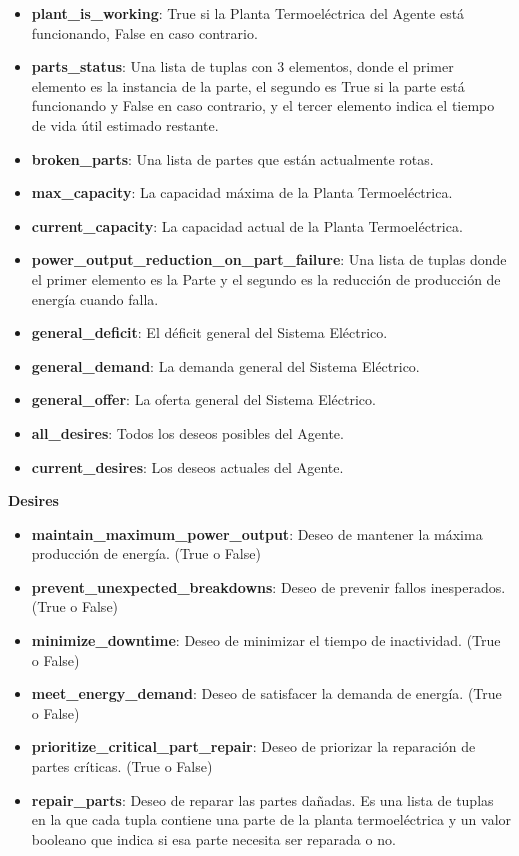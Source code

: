 \documentclass[twocolumn, fontsize=10pt]{article}
\begin{document}
\begin{itemize}
  \item \textbf{plant\_is\_working}: True si la Planta Termoeléctrica del Agente está funcionando, False en caso contrario.
  \item \textbf{parts\_status}: Una lista de tuplas con 3 elementos, donde el primer elemento es la instancia de la parte, el segundo es True si la parte está funcionando y False en caso contrario, y el tercer elemento indica el tiempo de vida útil estimado restante.
  \item \textbf{broken\_parts}: Una lista de partes que están actualmente rotas.
  \item \textbf{max\_capacity}: La capacidad máxima de la Planta Termoeléctrica.
  \item \textbf{current\_capacity}: La capacidad actual de la Planta Termoeléctrica.
  \item \textbf{power\_output\_reduction\_on\_part\_failure}: Una lista de tuplas donde el primer elemento es la Parte y el segundo es la reducción de producción de energía cuando falla.
  \item \textbf{general\_deficit}: El déficit general del Sistema Eléctrico.
  \item \textbf{general\_demand}: La demanda general del Sistema Eléctrico.
  \item \textbf{general\_offer}: La oferta general del Sistema Eléctrico.
  \item \textbf{all\_desires}: Todos los deseos posibles del Agente.
  \item \textbf{current\_desires}: Los deseos actuales del Agente.
\end{itemize}
\textbf{Desires}
\begin{itemize}
  
  \item \textbf{maintain\_maximum\_power\_output}: Deseo de mantener la máxima producción de energía. (True o False)
  \item \textbf{prevent\_unexpected\_breakdowns}: Deseo de prevenir fallos inesperados. (True o False)
  \item \textbf{minimize\_downtime}: Deseo de minimizar el tiempo de inactividad. (True o False)
  \item \textbf{meet\_energy\_demand}: Deseo de satisfacer la demanda de energía. (True o False)
  \item \textbf{prioritize\_critical\_part\_repair}: Deseo de priorizar la reparación de partes críticas. (True o False)
  \item \textbf{repair\_parts}: Deseo de reparar las partes dañadas. Es una lista de tuplas en la que cada tupla contiene una parte de la planta termoeléctrica y un valor booleano que indica si esa parte necesita ser reparada o no.

\end{itemize}
\end{document}
